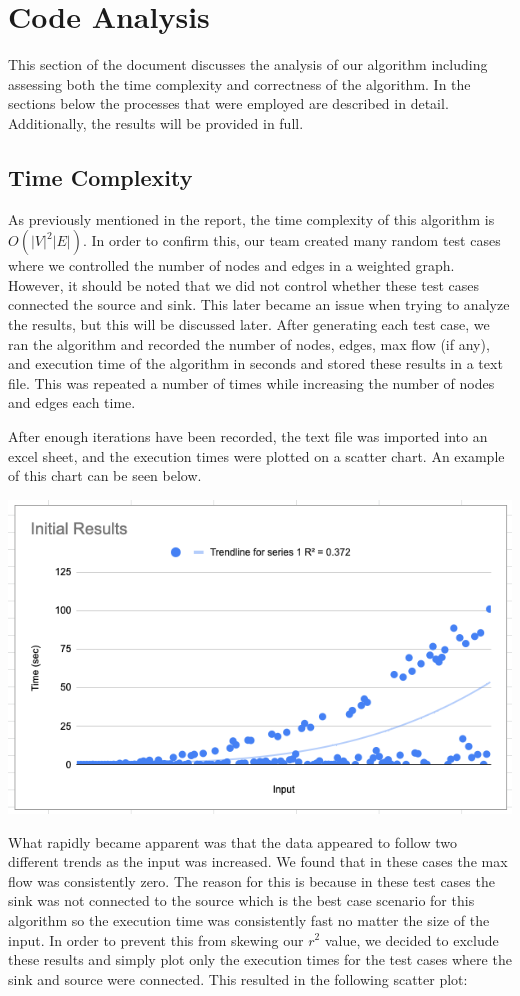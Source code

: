 \documentclass{report}
\begin{document}
\chapter{Code Analysis}
This section of the document discusses the analysis of our algorithm including assessing both the time complexity and correctness of the algorithm. In the sections below the processes that were employed are described in detail. Additionally, the results will be provided in full.

\section{Time Complexity}
As previously mentioned in the report, the time complexity of this algorithm is $O(|V|^2|E|)$. In order to confirm this, our team created many random test cases where we controlled the number of nodes and edges in a weighted graph. However, it should be noted that we did not control whether these test cases connected the source and sink. This later became an issue when trying to analyze the results, but this will be discussed later. After generating each test case, we ran the algorithm and recorded the number of nodes, edges, max flow (if any), and execution time of the algorithm in seconds and stored these results in a text file. This was repeated a number of times while increasing the number of nodes and edges each time.

After enough iterations have been recorded, the text file was imported into an excel sheet, and the execution times were plotted on a scatter chart. An example of this chart can be seen below.

\includegraphics[width=\textwidth]{assets/Josh1.png}

What rapidly became apparent was that the data appeared to follow two different trends as the input was increased. We found that in these cases the max flow was consistently zero. The reason for this is because in these test cases the sink was not connected to the source which is the best case scenario for this algorithm so the execution time was consistently fast no matter the size of the input. In order to prevent this from skewing our $r^2$ value, we decided to exclude these results and simply plot only the execution times for the test cases where the sink and source were connected. This resulted in the following scatter plot:
\end{document}
